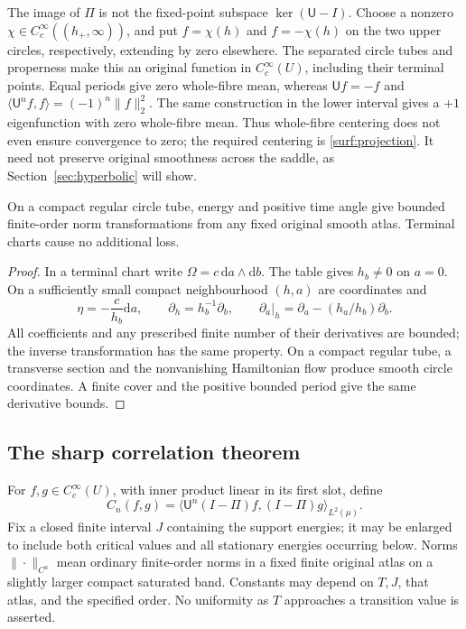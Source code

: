 The image of $\Pi$ is not the fixed-point subspace $\ker(\mathsf U-I)$.
Choose a nonzero $\chi\in C_c^\infty((h_+,\infty))$, and put
$f=\chi(h)$ and $f=-\chi(h)$ on the two upper circles, respectively,
extending by zero elsewhere. The separated circle tubes and properness
make this an original function in $C_c^\infty(U)$, including their
terminal points. Equal periods give zero whole-fibre mean, whereas
$\mathsf Uf=-f$ and
$\langle\mathsf U^n f,f\rangle=(-1)^n\|f\|_2^2$.
The same construction in the lower interval gives a $+1$ eigenfunction
with zero whole-fibre mean. Thus whole-fibre centering does not even
ensure convergence to zero; the required centering is
\eqref{surf:projection}. It need not preserve original smoothness
across the saddle, as Section~\ref{sec:hyperbolic} will show.

\begin{lemma}\label{lem:regular-norms}
On a compact regular circle tube, energy and positive time angle
give bounded finite-order norm transformations from any fixed original
smooth atlas. Terminal charts cause no additional loss.
\end{lemma}
\begin{proof}
In a terminal chart write $\Omega=c\,\mathrm da\wedge\mathrm db$.
The table gives $h_b\ne0$ on $a=0$. On a sufficiently small compact
neighbourhood $(h,a)$ are coordinates and
\[
 \eta=-\frac{c}{h_b}\mathrm da,\qquad
 \partial_h=h_b^{-1}\partial_b,\qquad
 \partial_a|_h=\partial_a-(h_a/h_b)\partial_b.
\]
All coefficients and any prescribed finite number of their derivatives
are bounded; the inverse transformation has the same property.
On a compact regular tube, a transverse section and the nonvanishing
Hamiltonian flow produce smooth circle coordinates. A finite cover
and the positive bounded period give the same derivative bounds.
\end{proof}

\subsection{The sharp correlation theorem}

For $f,g\in C_c^\infty(U)$, with inner product linear in its first
slot, define
\begin{equation}
 C_n(f,g)=\langle\mathsf U^n(I-\Pi)f,(I-\Pi)g\rangle_{L^2(\mu)}.
 \label{surf:correlation}
\end{equation}
Fix a closed finite interval $J$ containing the support energies;
it may be enlarged to include both critical values and all stationary
energies occurring below. Norms $\|\cdot\|_{C^a}$ mean ordinary
finite-order norms in a fixed finite original atlas on a slightly
larger compact saturated band. Constants may depend on $T,J$, that
atlas, and the specified order. No uniformity as $T$ approaches a
transition value is asserted.

